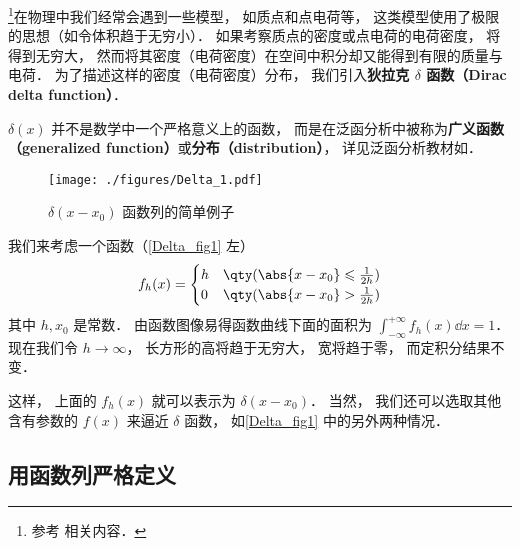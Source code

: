 
\begin{issues}
\end{issues}

\footnote{参考 \cite{Arfken} 相关内容．}在物理中我们经常会遇到一些模型， 如质点和点电荷等， 这类模型使用了极限的思想（如令体积趋于无穷小）． 如果考察质点的密度或点电荷的电荷密度， 将得到无穷大， 然而将其密度（电荷密度）在空间中积分却又能得到有限的质量与电荷． 为了描述这样的密度（电荷密度）分布， 我们引入\textbf{狄拉克 $\delta$ 函数（Dirac delta function）}．

$\delta(x)$ 并不是数学中一个严格意义上的函数， 而是在泛函分析中被称为\textbf{广义函数（generalized function）}或\textbf{分布（distribution）}， 详见泛函分析教材如\cite{Zeidler}．

\begin{figure}[ht]
\centering
\texttt{[image: ./figures/Delta\_1.pdf]}
\caption{$\delta(x - x_0)$ 函数列的简单例子} \label{Delta_fig1}
\end{figure}

我们来考虑一个函数（\autoref{Delta_fig1} 左）
\begin{equation}\label{Delta_eq6}
f_h(x) =
\begin{cases}
h & \qty( \abs{x - x_0} \leqslant \frac{1}{2h} )\\
0 & \qty( \abs{x - x_0} > \frac{1}{2h} )
\end{cases}
\end{equation}
其中 $h, x_0$ 是常数． 由函数图像易得函数曲线下面的面积为 $\int_{-\infty}^{+\infty} f_h(x) \dd{x} = 1$． 现在我们令 $h \to \infty$， 长方形的高将趋于无穷大， 宽将趋于零， 而定积分结果不变．

这样， 上面的 $f_h(x)$ 就可以表示为 $\delta(x - x_0)$． 当然， 我们还可以选取其他含有参数的 $f(x)$ 来逼近 $\delta$ 函数， 如\autoref{Delta_fig1} 中的另外两种情况．

\subsection{用函数列严格定义}

